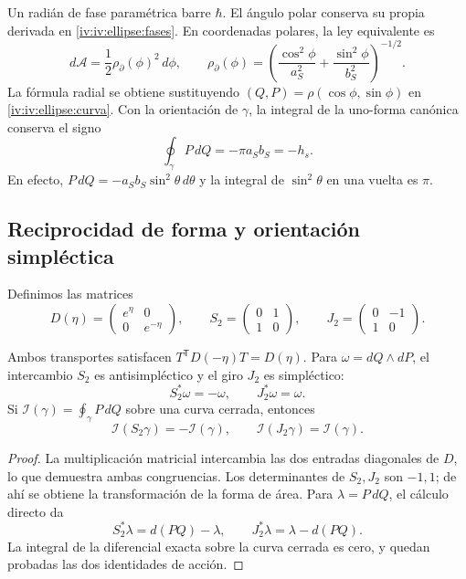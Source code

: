 Un radián de fase paramétrica barre \(\hbar\). El ángulo
polar conserva su propia derivada en
\eqref{iv:iv:ellipse:fases}. En coordenadas polares, la ley
equivalente es
\[
 d\mathcal A=\frac12\rho_{\partial}(\phi)^2\,d\phi,\qquad
 \rho_{\partial}(\phi)=
 \left(\frac{\cos^2\phi}{a_S^2}
       +\frac{\sin^2\phi}{b_S^2}\right)^{-1/2}.
\]
La fórmula radial se obtiene sustituyendo
\((Q,P)=\rho(\cos\phi,\sin\phi)\) en
\eqref{iv:iv:ellipse:curva}. Con la orientación de
\(\gamma\), la integral de la uno-forma canónica conserva
el signo
\begin{equation}
 \oint_\gamma P\,dQ=-\pi a_Sb_S=-h_s.
 \label{iv:iv:ellipse:accion-orientada}
\end{equation}
En efecto, \(P\,dQ=-a_Sb_S\sin^2\theta\,d\theta\) y
la integral de \(\sin^2\theta\) en una vuelta es \(\pi\).

\subsection{Reciprocidad de forma y orientación simpléctica}
\label{iv:iv:ellipse:reciprocidad}

Definimos las matrices
\begin{equation}
 D(\eta)=\begin{pmatrix}e^\eta&0\\0&e^{-\eta}\end{pmatrix},
 \qquad
 S_2=\begin{pmatrix}0&1\\1&0\end{pmatrix},
 \qquad
 J_2=\begin{pmatrix}0&-1\\1&0\end{pmatrix}.
 \label{iv:iv:ellipse:transportes}
\end{equation}

\begin{proposition}
\label{iv:iv:ellipse:accion-reciproca}
Ambos transportes satisfacen
\(T^{\mathsf T}D(-\eta)T=D(\eta)\).
Para \(\omega=dQ\wedge dP\), el intercambio \(S_2\) es
antisimpléctico y el giro \(J_2\) es simpléctico:
\[
 S_2^*\omega=-\omega,\qquad J_2^*\omega=\omega.
\]
Si \(\mathcal I(\gamma)=\oint_\gamma P\,dQ\) sobre una
curva cerrada, entonces
\begin{equation}
 \mathcal I(S_2\gamma)=-\mathcal I(\gamma),\qquad
 \mathcal I(J_2\gamma)=\mathcal I(\gamma).
 \label{iv:iv:ellipse:signos-accion}
\end{equation}
\end{proposition}
\begin{proof}
La multiplicación matricial intercambia las dos entradas
diagonales de \(D\), lo que demuestra ambas congruencias.
Los determinantes de \(S_2,J_2\) son \(-1,1\);
de ahí se obtiene la transformación de la forma de área.
Para \(\lambda=P\,dQ\), el cálculo directo da
\[
 S_2^*\lambda=d(PQ)-\lambda,\qquad
 J_2^*\lambda=\lambda-d(PQ).
\]
La integral de la diferencial exacta sobre la curva cerrada
es cero, y quedan probadas las dos identidades de acción.
\end{proof}


